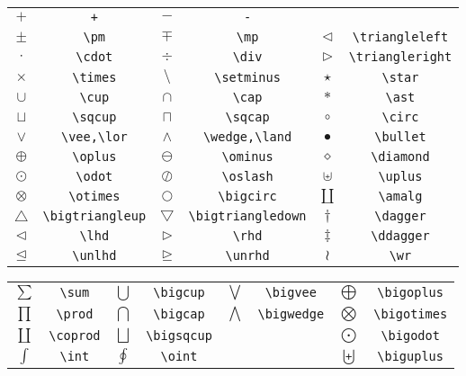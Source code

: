 \begin{table}[H]
\centering
\begin{tabular}{*{6}{c}}
$+ $&\verb|+| &$- $&\verb|-| && \\
$\pm $&\verb|\pm| &$\mp $&\verb|\mp| &$\triangleleft $&\verb|\triangleleft| \\
$\cdot $&\verb|\cdot| &$\div $&\verb|\div| &$\triangleright $&\verb|\triangleright| \\
$\times $&\verb|\times| &$\setminus $&\verb|\setminus| &$\star $&\verb|\star| \\
$\cup $&\verb|\cup| &$\cap $&\verb|\cap| &$\ast $&\verb|\ast| \\
$\sqcup $&\verb|\sqcup| &$\sqcap $&\verb|\sqcap| &$\circ $&\verb|\circ| \\
$\vee $&\verb|\vee,\lor| &$\wedge $&\verb|\wedge,\land| &$\bullet $&\verb|\bullet| \\
$\oplus $&\verb|\oplus| &$\ominus $&\verb|\ominus| &$\diamond $&\verb|\diamond| \\
$\odot $&\verb|\odot| &$\oslash$&\verb|\oslash| &$\uplus $&\verb|\uplus| \\
$\otimes $&\verb|\otimes| &$\bigcirc$&\verb|\bigcirc| &$\amalg $&\verb|\amalg| \\
$\bigtriangleup $&\verb|\bigtriangleup| &$\bigtriangledown $&\verb|\bigtriangledown| &$\dagger $&\verb|\dagger| \\
$\lhd$&\verb|\lhd|\hyperlink{latexsym}{\footnotemark[1]} &$\rhd $&\verb|\rhd|\hyperlink{latexsym}{\footnotemark[1]} &$\ddagger $&\verb|\ddagger| \\
$\unlhd $&\verb|\unlhd|\hyperlink{latexsym}{\footnotemark[1]} &$\unrhd $&\verb|\unrhd|\hyperlink{latexsym}{\footnotemark[1]} &$\wr $&\verb|\wr|
\end{tabular}
\end{table}

\begin{table}[H]
\centering
\begin{tabular}{*{8}{c}}
$\sum $ & \verb|\sum| &$\bigcup $ & \verb|\bigcup| &$\bigvee $ & \verb|\bigvee| &$ \bigoplus$ & \verb|\bigoplus| \\
$\prod $ & \verb|\prod| &$\bigcap $ & \verb|\bigcap| &$\bigwedge $ & \verb|\bigwedge| &$ \bigotimes$ & \verb|\bigotimes| \\
$\coprod $ & \verb|\coprod| &$\bigsqcup $ & \verb|\bigsqcup| & &  &$\bigodot $ & \verb|\bigodot| \\
$ \int$ & \verb|\int| &$\oint $ & \verb|\oint| &  &  &$ \biguplus$ & \verb|\biguplus| 
\end{tabular}
\end{table}


